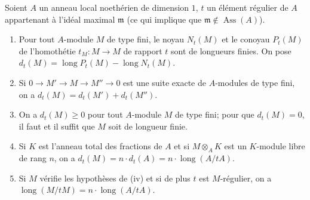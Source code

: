 \begin{lemma}[21.10.13]
\label{IV.21.10.13}
Soient $A$ un anneau local noethérien de dimension $1$, $t$ un élément régulier de $A$ appartenant à l'idéal maximal $\mathfrak{m}$ (ce qui implique que $\mathfrak{m}\notin\operatorname{Ass}(A)$).
\begin{enumerate}[label=(\roman*)]
  \item Pour tout $A$-module $M$ de type fini, le noyau $N_t(M)$ et le conoyau $P_t(M)$ de l'homothétie $t_M:M\to M$ de rapport $t$ sont de longueurs finies. On pose $d_t(M)=\operatorname{long}P_t(M)-\operatorname{long}N_t(M)$.
  \item Si $0\to M'\to M\to M''\to0$ est une suite exacte de $A$-modules de type fini, on a $d_t(M)=d_t(M')+d_t(M'')$.
  \item On a $d_t(M)\geq0$ pour tout $A$-module $M$ de type fini; pour que $d_t(M)=0$, il faut et il suffit que $M$ soit de longueur finie.
  \item Si $K$ est l'anneau total des fractions de $A$ et si $M\otimes_AK$ est un $K$-module libre de rang $n$, on a $d_t(M)=n\cdot d_t(A)=n\cdot\operatorname{long}(A/tA)$.
  \item Si $M$ vérifie les hypothèses de (iv) et si de plus $t$ est $M$-régulier, on a $\operatorname{long}(M/tM)=n\cdot\operatorname{long}(A/tA)$.
\end{enumerate}
\end{lemma}

